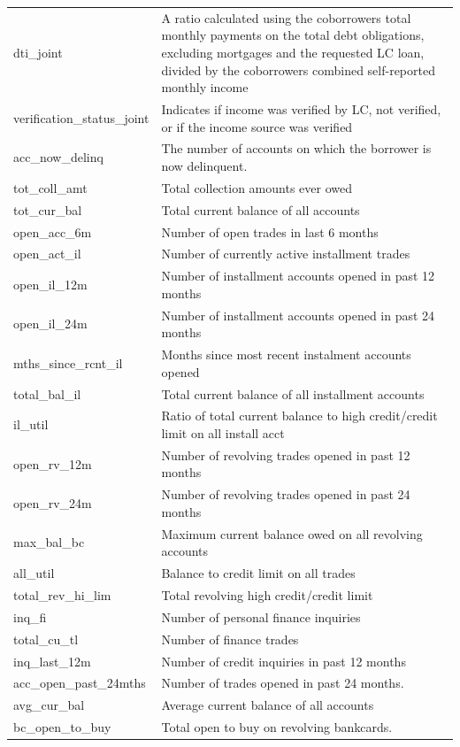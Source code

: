 \documentclass[11pt,]{report}
\begin{document}
\begin{longtable}[t]{>{\raggedright\arraybackslash}p{7cm}>{\raggedright\arraybackslash}p{7cm}}
dti\_joint & A ratio calculated using the coborrowers total monthly payments on the total debt obligations, excluding mortgages and the requested LC loan, divided by the coborrowers combined self-reported monthly income\\
verification\_status\_joint & Indicates if income was verified by LC, not verified, or if the income source was verified\\
acc\_now\_delinq & The number of accounts on which the borrower is now delinquent.\\
\addlinespace
tot\_coll\_amt & Total collection amounts ever owed\\
tot\_cur\_bal & Total current balance of all accounts\\
open\_acc\_6m & Number of open trades in last 6 months\\
open\_act\_il & Number of currently active installment trades\\
open\_il\_12m & Number of installment accounts opened in past 12 months\\
\addlinespace
open\_il\_24m & Number of installment accounts opened in past 24 months\\
mths\_since\_rcnt\_il & Months since most recent instalment accounts opened\\
total\_bal\_il & Total current balance of all installment accounts\\
il\_util & Ratio of total current balance to high credit/credit limit on all install acct\\
open\_rv\_12m & Number of revolving trades opened in past 12 months\\
\addlinespace
open\_rv\_24m & Number of revolving trades opened in past 24 months\\
max\_bal\_bc & Maximum current balance owed on all revolving accounts\\
all\_util & Balance to credit limit on all trades\\
total\_rev\_hi\_lim & Total revolving high credit/credit limit\\
inq\_fi & Number of personal finance inquiries\\
\addlinespace
total\_cu\_tl & Number of finance trades\\
inq\_last\_12m & Number of credit inquiries in past 12 months\\
acc\_open\_past\_24mths & Number of trades opened in past 24 months.\\
avg\_cur\_bal & Average current balance of all accounts\\
bc\_open\_to\_buy & Total open to buy on revolving bankcards.\\

\end{longtable}
\end{document}
